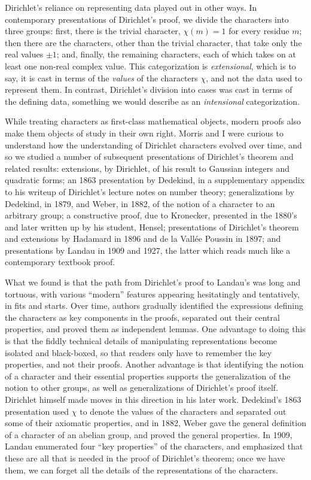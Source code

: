 \documentclass[11pt]{article}
\begin{document}
Dirichlet's reliance on representing data played out in other ways. In contemporary presentations of Dirichlet's proof, we divide the characters into three groups: first, there is the trivial character, $\chi(m) = 1$ for every residue $m$; then there are the characters, other than the trivial character, that take only the real values $\pm 1$; and, finally, the remaining characters, each of which takes on at least one non-real complex value. This categorization is \emph{extensional}, which is to say, it is cast in terms of the \emph{values} of the characters $\chi$, and not the data used to represent them. In contrast, Dirichlet's division into cases was cast in terms of the defining data, something we would describe as an \emph{intensional} categorization.

While treating characters as first-class mathematical objects, modern proofs also make them objects of study in their own right. Morris and I were curious to understand how the understanding of Dirichlet characters evolved over time, and so we studied a number of subsequent presentations of Dirichlet's theorem and related results: extensions, by Dirichlet, of his result to Gaussian integers and quadratic forms; an 1863 presentation by Dedekind, in a supplementary appendix to his writeup of Dirichlet's lecture notes on number theory; generalizations by Dedekind, in 1879, and Weber, in 1882, of the notion of a character to an arbitrary group;  a constructive proof, due to Kronecker, presented in the 1880's and later written up by his student, Hensel; presentations of Dirichlet's theorem and extensions by Hadamard in 1896 and de la Vall\'ee Poussin in 1897; and presentations by Landau in 1909 and 1927, the latter which reads much like a contemporary textbook proof.

What we found is that the path from Dirichlet's proof to Landau's was long and tortuous, with various ``modern'' features appearing hesitatingly and tentatively, in fits and starts. Over time, authors gradually identified the expressions defining the characters as key components in the proofs, separated out their central properties, and proved them as independent lemmas. One advantage to doing this is that the fiddly technical details of manipulating representations become isolated and black-boxed, so that readers only have to remember the key properties, and not their proofs. Another advantage is that identifying the notion of a character and their essential properties supports the generalization of the notion to other groups, as well as generalizations of Dirichlet's proof itself. Dirichlet himself made moves in this direction in his later work. Dedekind's 1863 presentation used $\chi$ to denote the values of the characters and separated out some of their axiomatic properties, and in 1882, Weber gave the general definition of a character of an abelian group, and proved the general properties. In 1909, Landau enumerated four ``key properties'' of the characters, and emphasized that these are all that is needed in the proof of Dirichlet's theorem; once we have them, we can forget all the details of the representations of the characters.
\end{document}
